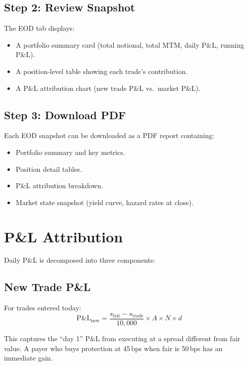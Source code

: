 \documentclass[11pt,a4paper]{article}
\begin{document}
\subsection{Step 2: Review Snapshot}

The EOD tab displays:
\begin{itemize}
  \item A portfolio summary card (total notional, total MTM, daily
        P\&L, running P\&L).
  \item A position-level table showing each trade's contribution.
  \item A P\&L attribution chart (new trade P\&L vs.\ market P\&L).
\end{itemize}

\subsection{Step 3: Download PDF}

Each EOD snapshot can be downloaded as a PDF report containing:
\begin{itemize}
  \item Portfolio summary and key metrics.
  \item Position detail tables.
  \item P\&L attribution breakdown.
  \item Market state snapshot (yield curve, hazard rates at close).
\end{itemize}


\section{P\&L Attribution}

Daily P\&L is decomposed into three components:

\subsection{New Trade P\&L}

For trades entered today:
\[
  \text{P\&L}_{\text{new}} = \frac{s_{\text{fair}} - s_{\text{trade}}}{10{,}000}
      \times A \times N \times d
\]

\noindent This captures the ``day 1'' P\&L from executing at a spread
different from fair value.  A payer who buys protection at 45\,bps when
fair is 50\,bps has an immediate gain.
\end{document}
